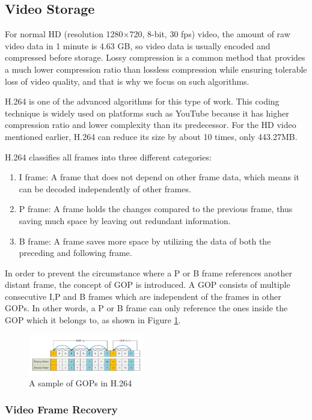 \documentclass[sigconf]{acmart}
\begin{document}
\subsection{Video Storage}\label{video storage}
For normal HD (resolution 1280$\times$720, 8-bit, 30 fps) video, the amount of raw video data in 1 minute is 4.63 GB, so video data is usually encoded and compressed before storage. Lossy compression is a common method that provides a much lower compression ratio than lossless compression while ensuring tolerable loss of video quality, and that is why we focus on such algorithms.


H.264 is one of the advanced algorithms for this type of work. This coding technique is widely used on platforms such as YouTube because it has higher compression ratio and lower complexity than its predecessor. For the HD video mentioned earlier, H.264 can reduce its size by about 10 times, only 443.27MB.

H.264 classifies all frames into three different categories:
\begin{enumerate}
    \item I frame: A frame that does not depend on other frame data, which means it can be decoded independently of other frames.
    \item P frame: A frame holds the changes compared to the previous frame, thus saving much space by leaving out redundant information.
    \item B frame: A frame saves more space by utilizing the data of both the preceding and following frame.
\end{enumerate}
In order to prevent the circumstance where a P or B frame references another distant frame, the concept of GOP is introduced. A GOP consists of multiple consecutive I,P and B frames which are independent of the frames in other GOPs. In other words, a P or B frame can only reference the ones inside the GOP which it belongs to, as shown in Figure \ref{H264-IPB}.
\begin{figure}[ht]
\centering
\includegraphics[width=0.45\textwidth]{photo/H264_IPB.pdf}
\caption{A sample of GOPs in H.264}
\label{H264-IPB}
\end{figure}


\subsubsection{Video Frame Recovery}
\end{document}
